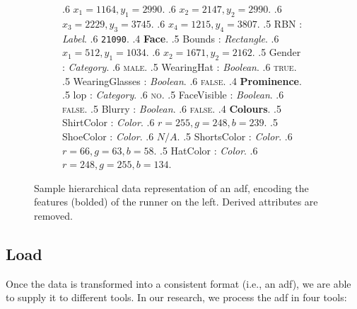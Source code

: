 \begin{figure}
\begin{subfigure}[b]{0.50\textwidth}
{      .6 $x_{1} = 1164, y_{1} = 2990$.
      .6 $x_{2} = 2147, y_{2} = 2990$.
      .6 $x_{3} = 2229, y_{3} = 3745$.
      .6 $x_{4} = 1215, y_{4} = 3807$.
      .5 RBN : \textit{Label}. 
      .6 \texttt{21090}.
      .4 \textbf{Face}.
      .5 Bounds : \textit{Rectangle}.    
      .6 $x_{1} = 512, y_{1} = 1034$.
      .6 $x_{2} = 1671, y_{2} = 2162$.
      .5 Gender : \textit{Category}.
      .6 \textsc{male}.
      .5 WearingHat : \textit{Boolean}.
      .6 \textsc{true}.
      .5 WearingGlasses : \textit{Boolean}.
      .6 \textsc{false}.
      .4 \textbf{Prominence}.
      .5 \gls{lop} : \textit{Category}.
      .6 \textsc{no}.
      .5 FaceVisible : \textit{Boolean}.
      .6 \textsc{false}.
      .5 Blurry : \textit{Boolean}.
      .6 \textsc{false}.
      .4 \textbf{Colours}.
      .5 ShirtColor : \textit{Color}.
      .6 $r = 255, g = 248, b = 239$.
      .5 ShoeColor : \textit{Color}.
      .6 $N/A$.
      .5 ShortsColor : \textit{Color}.
      .6 $r = 66, g = 63, b = 58$.
      .5 HatColor : \textit{Color}.
      .6 $r = 248, g = 255, b = 134$.
    }  
  \end{subfigure}
  \caption[Sample representation of an ADF]{Sample hierarchical data representation of an \gls{adf}, encoding the features (bolded) of the runner on the left. Derived attributes are removed.}
  \label{fig:dataset:adf_representation}
\end{figure}

\subsection{Load}
\label{sec:dataset:process:load}

Once the data is transformed into a consistent format (i.e., an \gls{adf}), we are able to supply it to different tools. In our research, we process the \gls{adf} in four tools:

